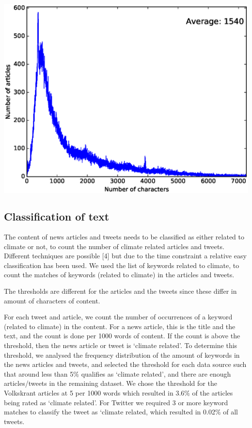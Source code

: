 \documentclass[paper=a4, fontsize=9px]{scrartcl} %
\numberwithin{equation}{section} %
\numberwithin{figure}{section} %
\numberwithin{table}{section} %
\newenvironment{Figure}
{\par\medskip\noindent\minipage{\linewidth}}
{\endminipage\par\medskip}
\begin{document}
\begin{multicols}{2}
\begin{Figure}
	\includegraphics[width=\textwidth]{img/articles_characters}
	\label{fig:9}
\end{Figure}



\subsection{Classification of text}

The content of news articles and tweets needs to be classified as either related to climate or not, to count the number of climate related articles and tweets. Different techniques are possible [4] but due to the time constraint a relative easy classification has been used. We used the list of keywords related to climate, to count the matches of keywords (related to climate) in the articles and tweets.

The thresholds are different for the articles and the tweets since these differ in amount of characters of content. 

For each tweet and article, we count the number of occurrences of a keyword (related to climate) in the content. For a news article, this is the title and the text, and the count is done per 1000 words of content. If the count is above the threshold, then the news article or tweet is `climate related’. To determine this threshold, we analysed the frequency distribution of the amount of keywords in the news articles and tweets, and selected the threshold for each data source such that around less than 5\% qualifies as `climate related’, and there are enough articles/tweets in the remaining dataset. We chose the threshold for the Volkskrant articles at 5 per 1000 words which resulted in 3.6\% of the articles being rated as `climate related'. For Twitter we required 3 or more keyword matches to classify the tweet as `climate related, which resulted in 0.02\% of all tweets.


\end{multicols}
\end{document}
